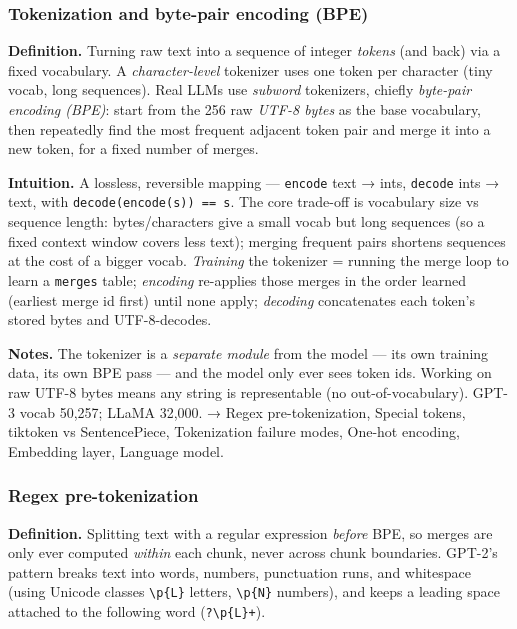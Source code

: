 \documentclass[
  10pt,
  letterpaper,
  onecolumn]{article}
\begin{document}
\hypertarget{tokenization-and-byte-pair-encoding-bpe}{%
\subsubsection{Tokenization and byte-pair encoding
(BPE)}\label{tokenization-and-byte-pair-encoding-bpe}}

\textbf{Definition.} Turning raw text into a sequence of integer
\emph{tokens} (and back) via a fixed vocabulary. A
\emph{character-level} tokenizer uses one token per character (tiny
vocab, long sequences). Real LLMs use \emph{subword} tokenizers, chiefly
\emph{byte-pair encoding (BPE)}: start from the 256 raw \emph{UTF-8
bytes} as the base vocabulary, then repeatedly find the most frequent
adjacent token pair and merge it into a new token, for a fixed number of
merges.

\textbf{Intuition.} A lossless, reversible mapping --- \texttt{encode}
text → ints, \texttt{decode} ints → text, with
\texttt{decode(encode(s))\ ==\ s}. The core trade-off is vocabulary size
vs sequence length: bytes/characters give a small vocab but long
sequences (so a fixed context window covers less text); merging frequent
pairs shortens sequences at the cost of a bigger vocab. \emph{Training}
the tokenizer = running the merge loop to learn a \texttt{merges} table;
\emph{encoding} re-applies those merges in the order learned (earliest
merge id first) until none apply; \emph{decoding} concatenates each
token's stored bytes and UTF-8-decodes.

\textbf{Notes.} The tokenizer is a \emph{separate module} from the model
--- its own training data, its own BPE pass --- and the model only ever
sees token ids. Working on raw UTF-8 bytes means any string is
representable (no out-of-vocabulary). GPT-3 vocab 50,257; LLaMA 32,000.
→ Regex pre-tokenization, Special tokens, tiktoken vs SentencePiece,
Tokenization failure modes, One-hot encoding, Embedding layer, Language
model.

\hypertarget{regex-pre-tokenization}{%
\subsubsection{Regex pre-tokenization}\label{regex-pre-tokenization}}

\textbf{Definition.} Splitting text with a regular expression
\emph{before} BPE, so merges are only ever computed \emph{within} each
chunk, never across chunk boundaries. GPT-2's pattern breaks text into
words, numbers, punctuation runs, and whitespace (using Unicode classes
\texttt{\textbackslash{}p\{L\}} letters, \texttt{\textbackslash{}p\{N\}}
numbers), and keeps a leading space attached to the following word
(\texttt{?\textbackslash{}p\{L\}+}).
\end{document}

